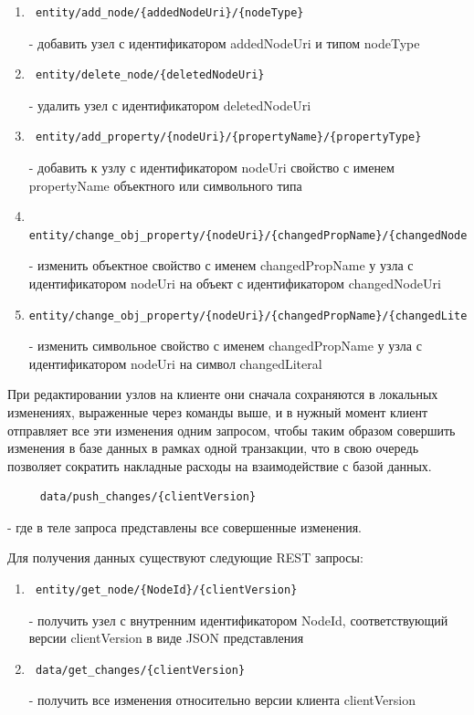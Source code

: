 \documentclass[12pt]{article}
\begin{document}
\begin{enumerate}
    \item \begin{verbatim} entity/add_node/{addedNodeUri}/{nodeType} \end{verbatim}
          - добавить узел с идентификатором addedNodeUri и типом nodeType
    \item \begin{verbatim} entity/delete_node/{deletedNodeUri}\end{verbatim}
          - удалить узел с идентификатором deletedNodeUri
    \item \begin{verbatim} entity/add_property/{nodeUri}/{propertyName}/{propertyType}\end{verbatim}
          - добавить к узлу с идентификатором nodeUri свойство с именем propertyName объектного или символьного типа
    \item \begin{verbatim} entity/change_obj_property/{nodeUri}/{changedPropName}/{changedNodeUri} \end{verbatim}
          - изменить объектное свойство с именем changedPropName у узла с идентификатором nodeUri на объект с идентификатором changedNodeUri
    \item \begin{verbatim}entity/change_obj_property/{nodeUri}/{changedPropName}/{changedLiteral} 
\end{verbatim}
          - изменить символьное свойство с именем changedPropName у узла с идентификатором nodeUri на символ changedLiteral
\end{enumerate}

При редактировании узлов на клиенте они сначала сохраняются в локальных изменениях, выраженные через команды выше, и в нужный момент клиент отправляет все эти изменения одним запросом, чтобы таким образом совершить изменения в базе данных в рамках одной транзакции, что в свою очередь позволяет сократить накладные расходы на взаимодействие с базой данных.

\begin{verbatim}     data/push_changes/{clientVersion} \end{verbatim}
\qquad - где в теле запроса представлены все совершенные изменения.

Для получения данных существуют следующие REST запросы:

\begin{enumerate}
    \item \begin{verbatim} entity/get_node/{NodeId}/{clientVersion} \end{verbatim}
          - получить узел с внутренним идентификатором NodeId, соответствующий версии clientVersion в виде JSON представления
    \item \begin{verbatim} data/get_changes/{clientVersion} \end{verbatim}
          - получить все изменения относительно версии клиента clientVersion
\end{enumerate}
\end{document}
